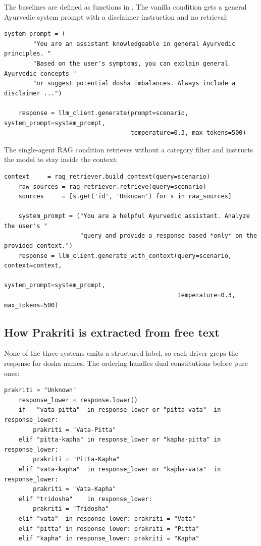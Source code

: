 The baselines are defined as functions in . The vanilla condition gets a general Ayurvedic system prompt with a disclaimer instruction and no retrieval:

\begin{lstlisting}[style=py,firstnumber=29]
    system_prompt = (
        "You are an assistant knowledgeable in general Ayurvedic principles. "
        "Based on the user's symptoms, you can explain general Ayurvedic concepts "
        "or suggest potential dosha imbalances. Always include a disclaimer ...")

    response = llm_client.generate(prompt=scenario, system_prompt=system_prompt,
                                   temperature=0.3, max_tokens=500)
\end{lstlisting}

The single-agent RAG condition retrieves without a category filter and instructs the model to stay inside the context:

\begin{lstlisting}[style=py,firstnumber=73]
    context     = rag_retriever.build_context(query=scenario)
    raw_sources = rag_retriever.retrieve(query=scenario)
    sources     = [s.get('id', 'Unknown') for s in raw_sources]

    system_prompt = ("You are a helpful Ayurvedic assistant. Analyze the user's "
                     "query and provide a response based *only* on the provided context.")
    response = llm_client.generate_with_context(query=scenario, context=context,
                                                system_prompt=system_prompt,
                                                temperature=0.3, max_tokens=500)
\end{lstlisting}

\subsection{How Prakriti is extracted from free text}

None of the three systems emits a structured label, so each driver greps the response for dosha names. The ordering handles dual constitutions before pure ones:

\begin{lstlisting}[style=py,firstnumber=45]
    prakriti = "Unknown"
    response_lower = response.lower()
    if   "vata-pitta"  in response_lower or "pitta-vata"  in response_lower:
        prakriti = "Vata-Pitta"
    elif "pitta-kapha" in response_lower or "kapha-pitta" in response_lower:
        prakriti = "Pitta-Kapha"
    elif "vata-kapha"  in response_lower or "kapha-vata"  in response_lower:
        prakriti = "Vata-Kapha"
    elif "tridosha"    in response_lower:
        prakriti = "Tridosha"
    elif "vata"  in response_lower: prakriti = "Vata"
    elif "pitta" in response_lower: prakriti = "Pitta"
    elif "kapha" in response_lower: prakriti = "Kapha"
\end{lstlisting}

